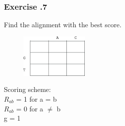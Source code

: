 %
%
\subsubsection*{Exercise \thesection.7}
	
Find the alignment with the best score.

\begin{multicols}{2}
\begin{figure}[H]
  \centering
      \includegraphics[width=0.3\textwidth]{fig02/back_tracking_exercise.png}
\end{figure}

\noindent Scoring scheme: \\ 
$R_{ab}$ = 1 for a = b \\ 
$R_{ab}$ = 0 for a $\neq$ b \\ 
g = 1

\end{multicols} 

%
